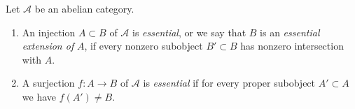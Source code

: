\begin{definition}
\label{definition-essential}
Let $\mathcal{A}$ be an abelian category.
\begin{enumerate}
\item An injection $A \subset B$ of $\mathcal{A}$ is {\it essential},
or we say that $B$ is an {\it essential extension of} $A$,
if every nonzero subobject $B' \subset B$ has nonzero intersection with $A$.
\item A surjection $f : A \to B$ of $\mathcal{A}$ is {\it essential}
if for every proper subobject $A' \subset A$ we have $f(A') \not = B$.
\end{enumerate}
\end{definition}